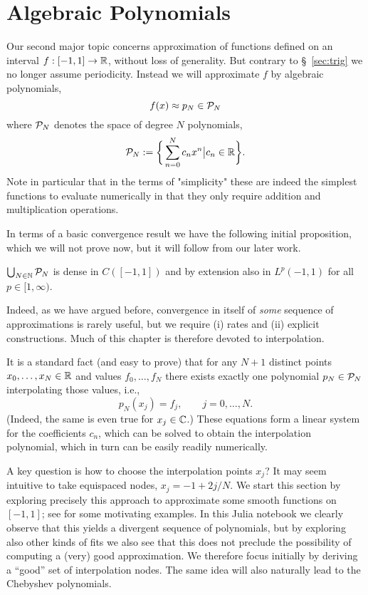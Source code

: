 

\section{Algebraic Polynomials}
%
\label{sec:poly}
% 
Our second major topic concerns approximation of functions defined on an
interval $f : [-1, 1] \to \mathbb{R}$, without loss of generality. But contrary to
\S~\ref{sec:trig} we no longer assume periodicity. Instead we will approximate
$f$ by algebraic polynomials,
\[
      f(x) \approx p_N \in \mathcal{P}_N
\]
where $\mathcal{P}_N$ denotes the space of degree $N$ polynomials,
\[
   \mathcal{P}_N := \bigg\{ \sum_{n = 0}^N c_n x^n \big| c_n \in \mathbb{R} \bigg\}.
\]
Note in particular that in the terms of "simplicity" these are indeed the 
simplest functions to evaluate numerically in that they only require addition 
and multiplication operations. 

In terms of a basic convergence result we have the following initial 
proposition, which we will not prove now, but it will follow from our 
later work.

\begin{proposition} \label{th:poly:Weierstrass}
   $\bigcup_{N \in \mathbb{N}} \mathcal{P}_N$ is dense in $C([-1,1])$ and by extension also 
   in $L^p(-1,1)$ for all $p \in [1, \infty)$.
\end{proposition}

\bigskip 

Indeed, as we have argued before, convergence in itself of {\em some} sequence
of approximations  is rarely useful, but we require (i) rates and (ii) explicit
constructions. Much of this chapter is therefore devoted to interpolation.

It is a standard fact (and easy to prove) that for any $N+1$ distinct points
$x_0, \dots, x_N \in \mathbb{R}$ and values $f_0, \dots, f_N$ there exists exactly one
polynomial $p_N \in \mathcal{P}_N$ interpolating those values, i.e., 
\[
   p_N(x_j) = f_j, \qquad j = 0, \dots, N.
\]
(Indeed, the same is even true for $x_j \in \mathbb{C}$.) These equations form 
a linear system for the coefficients $c_n$, which can be solved to obtain 
the interpolation polynomial, which in turn can be easily readily 
numerically. 

A key question is how to choose the interpolation points $x_j$? It may seem
intuitive to take equispaced nodes, $x_j = -1 + 2j/N$.  We start this section by
exploring precisely this approach to approximate some smooth functions on
$[-1,1]$; see \nbpoly for some motivating examples. In this Julia notebook we
clearly observe that this yields a divergent sequence of polynomials, but by
exploring also other kinds of fits we also see that this does not preclude the
possibility of computing a (very) good approximation. We therefore focus
initially by deriving a ``good'' set of interpolation nodes. The same idea will
also naturally lead to the Chebyshev polynomials.


